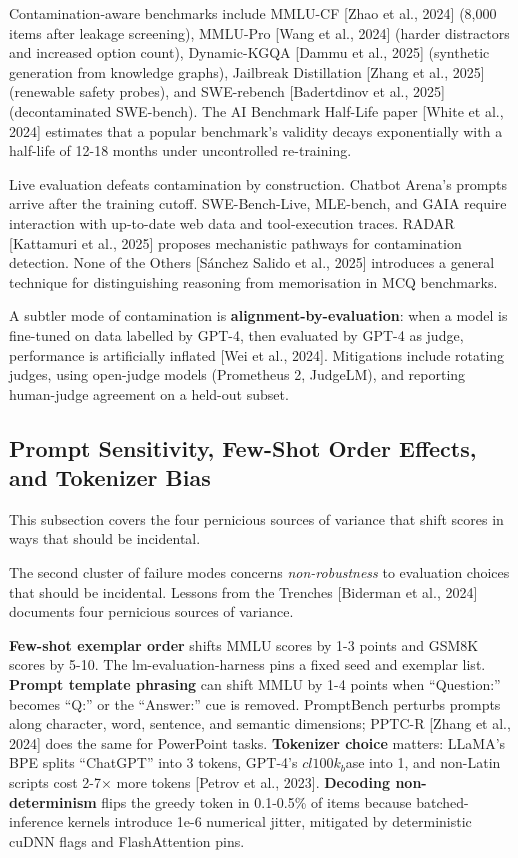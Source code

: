 Contamination-aware benchmarks include MMLU-CF {[}Zhao et al., 2024{]} (8,000 items after leakage screening), MMLU-Pro {[}Wang et al., 2024{]} (harder distractors and increased option count), Dynamic-KGQA {[}Dammu et al., 2025{]} (synthetic generation from knowledge graphs), Jailbreak Distillation {[}Zhang et al., 2025{]} (renewable safety probes), and SWE-rebench {[}Badertdinov et al., 2025{]} (decontaminated SWE-bench). The AI Benchmark Half-Life paper {[}White et al., 2024{]} estimates that a popular benchmark's validity decays exponentially with a half-life of 12-18 months under uncontrolled re-training.

Live evaluation defeats contamination by construction. Chatbot Arena's prompts arrive after the training cutoff. SWE-Bench-Live, MLE-bench, and GAIA require interaction with up-to-date web data and tool-execution traces. RADAR {[}Kattamuri et al., 2025{]} proposes mechanistic pathways for contamination detection. None of the Others {[}Sánchez Salido et al., 2025{]} introduces a general technique for distinguishing reasoning from memorisation in MCQ benchmarks.

A subtler mode of contamination is \textbf{alignment-by-evaluation}: when a model is fine-tuned on data labelled by GPT-4, then evaluated by GPT-4 as judge, performance is artificially inflated {[}Wei et al., 2024{]}. Mitigations include rotating judges, using open-judge models (Prometheus 2, JudgeLM), and reporting human-judge agreement on a held-out subset.

\subsection{Prompt Sensitivity, Few-Shot Order Effects, and Tokenizer Bias}\label{prompt-sensitivity-few-shot-order-effects-and-tokenizer-bias}

This subsection covers the four pernicious sources of variance that shift scores in ways that should be incidental.

The second cluster of failure modes concerns \emph{non-robustness} to evaluation choices that should be incidental. Lessons from the Trenches {[}Biderman et al., 2024{]} documents four pernicious sources of variance.

\textbf{Few-shot exemplar order} shifts MMLU scores by 1-3 points and GSM8K scores by 5-10. The lm-evaluation-harness pins a fixed seed and exemplar list. \textbf{Prompt template phrasing} can shift MMLU by 1-4 points when ``Question:'' becomes ``Q:'' or the ``Answer:'' cue is removed. PromptBench perturbs prompts along character, word, sentence, and semantic dimensions; PPTC-R {[}Zhang et al., 2024{]} does the same for PowerPoint tasks. \textbf{Tokenizer choice} matters: LLaMA's BPE splits ``ChatGPT'' into 3 tokens, GPT-4's \(cl100k_b\)ase into 1, and non-Latin scripts cost 2-7× more tokens {[}Petrov et al., 2023{]}. \textbf{Decoding non-determinism} flips the greedy token in 0.1-0.5\% of items because batched-inference kernels introduce 1e-6 numerical jitter, mitigated by deterministic cuDNN flags and FlashAttention pins.

